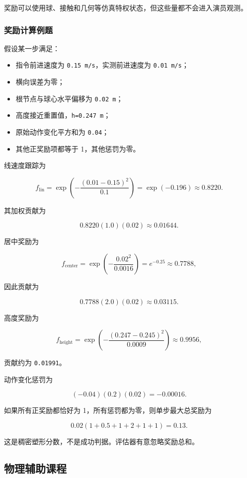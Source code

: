 \documentclass[
  chinese,
  11pt,
  letterpaper,
]{article}
\providecommand{\tightlist}{%
  \setlength{\itemsep}{0pt}\setlength{\parskip}{0pt}}
\begin{document}
奖励可以使用球、接触和几何等仿真特权状态，但这些量都不会进入演员观测。

\subsubsection{奖励计算例题}\label{ux5956ux52b1ux8ba1ux7b97ux4f8bux9898}

假设某一步满足：

\begin{itemize}
\tightlist
\item
  指令前进速度为 \texttt{0.15\ m/s}，实测前进速度为 \texttt{0.01\ m/s}；
\item
  横向误差为零；
\item
  根节点与球心水平偏移为 \texttt{0.02\ m}；
\item
  高度接近重置值，\texttt{h=0.247\ m}；
\item
  原始动作变化平方和为 \texttt{0.04}；
\item
  其他正奖励项都等于 1，其他惩罚为零。
\end{itemize}

线速度跟踪为

\[
f_{\text{lin}}
=\exp\left(-\frac{(0.01-0.15)^2}{0.1}\right)
=\exp(-0.196)
\approx0.8220.
\]

其加权贡献为

\[
0.8220(1.0)(0.02)\approx0.01644.
\]

居中奖励为

\[
f_{\text{center}}
=\exp\left(-\frac{0.02^2}{0.0016}\right)
=e^{-0.25}
\approx0.7788,
\]

因此贡献为

\[
0.7788(2.0)(0.02)\approx0.03115.
\]

高度奖励为

\[
f_{\text{height}}
=\exp\left(-\frac{(0.247-0.245)^2}{0.0009}\right)
\approx0.9956,
\]

贡献约为 \texttt{0.01991}。

动作变化惩罚为

\[
(-0.04)(0.2)(0.02)=-0.00016.
\]

如果所有正奖励都恰好为 1，所有惩罚都为零，则单步最大总奖励为

\[
0.02(1+0.5+1+2+1+1)=0.13.
\]

这是稠密塑形分数，不是成功判据。评估器有意忽略奖励总和。

\subsection{物理辅助课程}\label{ux7269ux7406ux8f85ux52a9ux8bfeux7a0b}
\end{document}
